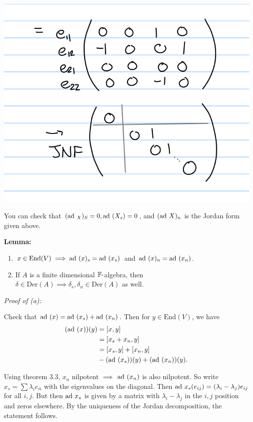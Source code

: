 \includegraphics{figures/2019-08-28-09:40.png}

You can check that \((\mathrm{ad}~_X)_S = 0, \mathrm{ad}~(X_s) = 0\), and \((\mathrm{ad}~ X)_n\) is
the Jordan form given above.

\textbf{Lemma:}

\begin{enumerate}
\def\labelenumi{(\alph{enumi})}
\item
  \(x \in \mathrm{End}(V) \implies \mathrm{ad}~(x)_s = \mathrm{ad}~(x_s)\) and
  \(\mathrm{ad}~(x)_n = \mathrm{ad}~(x_n)\).
\item
  If \(A\) is a finite dimensional \({\mathbb{F}}{\hbox{-}}\)algebra, then
  \(\delta \in \mathrm{Der}(A) \implies \delta_s, \delta_n \in \mathrm{Der}(A)\)
  as well.
\end{enumerate}

\emph{Proof of (a):}

Check that \(\mathrm{ad}~(x) = \mathrm{ad}~(x_s) + \mathrm{ad}~(x_n)\). Then for
\(y\in \mathrm{End}(V)\), we have \begin{align*}
(\mathrm{ad}~(x))(y)
&= [x, y] \\
&= [x_s + x_n, y] \\
&= [x_s, y] + [x_n, y] \\
&- (\mathrm{ad}~(x_s))(y) + (\mathrm{ad}~(x_n))(y)
.\end{align*}

Using theorem 3.3, \(x_n\) nilpotent \(\implies\) \(\mathrm{ad}~(x_n)\) is also
nilpotent. So write \(x_s = \sum \lambda_i e_{ii}\) with the eigenvalues
on the diagonal. Then
\(\mathrm{ad}~ x_s (e_{ij}) = (\lambda_i - \lambda_j)e_{ij}\) for all \(i, j\).
But then \(\mathrm{ad}~ x_s\) is given by a matrix with \(\lambda_i - \lambda_j\)
in the \(i,j\) position and zeros elsewhere. By the uniqueness of the
Jordan decomposition, the statement follows.


